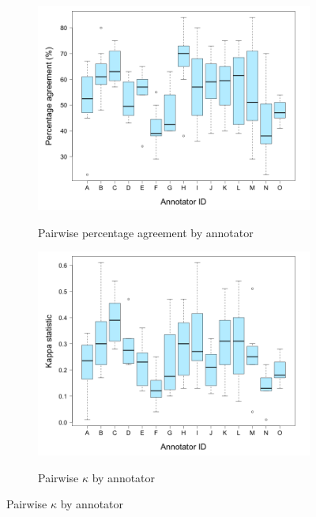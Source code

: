 		\begin{figure}[p]
			\centering
			
			

			

			
			\begin{subfigure}{\textwidth}
				\centering
				\caption{Pairwise percentage agreement by annotator}
				\includegraphics[width=.9\textwidth]{img/plots/pairwisePercentageByAnnotator-noTitle}
				\label{fig:agreement:annotators:pct}
			\end{subfigure}%

			\vspace{2em}			
			
			
			\begin{subfigure}{\textwidth}
				\centering
				\caption{Pairwise $\kappa$ by annotator}
				\includegraphics[width=.9\textwidth]{img/plots/pairwiseKappaByAnnotator-noTitle}
				\label{fig:agreement:annotators:k}
			\end{subfigure}%
			

\end{figure}
